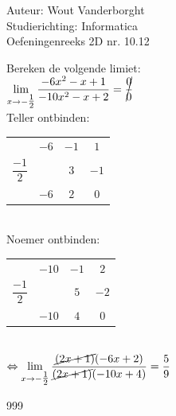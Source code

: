 \documentclass[a4paper]{article}
\newcommand{\Limit}{\lim\limits_}
\begin{document}
  
\noindent \large Auteur: Wout Vanderborght\\
\noindent \large Studierichting: Informatica\\
\noindent \large Oefeningenreeks 2D nr. 10.12\\

\medskip

\normalsize

Bereken de volgende limiet: \\

$ \Limit{x \rightarrow -\tfrac{1}{2}} \dfrac{-6x^2-x+1}{-10x^2-x+2} = \cancel{\dfrac{0}{0}} $ \\

Teller ontbinden: \\

\begin{tabular}{c|cc|c}
    & $-6$ & $-1$ & $1$ \\
    $\dfrac{-1}{2}$ & & $3$ & $-1$ \\ \hline
    & $-6$ & $2$ & $0$
\end{tabular} \\ 

Noemer ontbinden: \\

\begin{tabular}{c|cc|c}
    & $-10$ & $-1$ & $2$ \\
    $\dfrac{-1}{2}$ & & $5$ & $-2$ \\ \hline
    & $-10$ & $4$ & $0$
\end{tabular} \\ 

$ \Leftrightarrow \Limit{x \rightarrow -\tfrac{1}{2}} \dfrac{\cancel{(2x+1)} (-6x+2)}{\cancel{(2x+1)} (-10x+4)} = \dfrac{5}{9} $ \\

\begin{thebibliography}{999}
\end{thebibliography}
\end{document}
